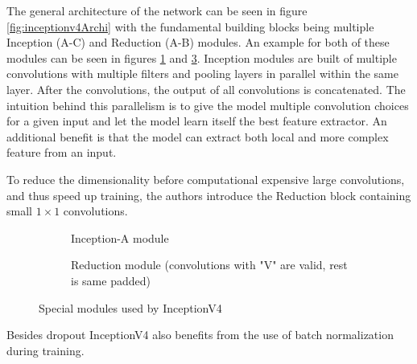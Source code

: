 The general architecture of the network can be seen in figure \ref{fig:inceptionv4Archi} with the fundamental building blocks being multiple Inception (A-C) and Reduction (A-B) modules. 
An example for both of these modules can be seen in figures \ref{fig:InceptionA} and \ref{fig:InceptionReduction}.
Inception modules are built of multiple convolutions with multiple filters and pooling layers in parallel within the same layer.
After the convolutions, the output of all convolutions is concatenated.
The intuition behind this parallelism is to give the model multiple convolution choices for a given input and let the model learn itself the best feature extractor. An additional benefit is that the model can extract both local and more complex feature from an input.

To reduce the dimensionality before computational expensive large convolutions, and thus speed up training, the authors introduce the Reduction block containing small $1\times1$ convolutions.   %




\begin{figure}[!htb]
\centering
\begin{subfigure}[b]{.95\textwidth}
\centering
   \resizebox{.8\linewidth}{!}{}
   \caption{Inception-A module}
   \label{fig:InceptionA} 
\end{subfigure}

\vspace{1em}
\begin{subfigure}[b]{.95\textwidth}
\centering
   \resizebox{.6\linewidth}{!}{}
   \caption{Reduction module (convolutions with "V" are valid, rest is same padded)}
   \label{fig:InceptionReduction}
\end{subfigure}

\caption{Special modules used by InceptionV4}

\end{figure}




Besides dropout InceptionV4 also benefits from the use of batch normalization during training.


